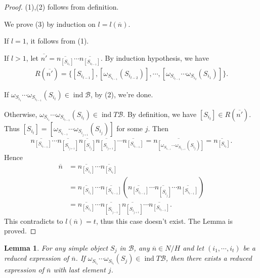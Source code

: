 \documentclass[12pt]{amsart}
\newtheorem{lemma}[theorem]{Lemma}
\begin{document}
\begin{proof}
    (1),(2) follows from definition.

    We prove (3) by induction on $l=l(\overline{n})$.

    If $l=1$, it follows from (1).

    If $l>1$, let $\overline{n'} = \overline{n_{[S_{i_1}]}} \cdots \overline{n_{[S_{i_{t-1}}]}}$. 
    By induction hypothesis, we have 
    \begin{align*}
        R(\overline{n'}) = \{ [S_{i_{t-1}}], [\omega_{S_{i_{t-1}}}(S_{i_{t-2}})], \cdots,[\omega_{S_{i_{t-1}}} \cdots \omega_{S_{i_2}}(S_{i_1})]   \}.
    \end{align*}
    
    If $\omega_{S_{i_1}} \cdots \omega_{S_{i_{t-1}}}(S_{i_t}) \in \operatorname{ind}\mathcal{B}$, by (2), we're done.
    
    Otherwise, $\omega_{S_{i_1}} \cdots \omega_{S_{i_{t-1}}}(S_{i_t}) \in \operatorname{ind}T\mathcal{B} $.
    By definition, we have $[S_{i_t}]\in R(\overline{n'})$.
    Thus $[S_{i_t}] = [\omega_{S_{i_{t-1}}} \cdots \omega_{S_{i_{j+1}}}(S_{i_j})] $ for some $j$.
    Then 
    \begin{align*}
         \overline{n_{[S_{i_{t-1}}]}} \cdots \overline{n_{[S_{i_{j+1}}]}} \overline{n_{[S_{i_{j}}]}} \overline{n_{[S_{i_{j+1}}]}} \cdots \overline{n_{[S_{i_{t-1}}]}} = \overline{n_{[ \omega_{S_{i_{t-1}}} \cdots \omega_{S_{i_{j+1}}}(S_{i_j}) ]}} = \overline{n_{[S_{i_t}]}}.
    \end{align*}
    Hence 
    \begin{align*}
        \overline{n}& = \overline{n_{[S_{i_1}]}} \cdots \overline{n_{[S_{i_t}]}} \\
             &= \overline{n_{[S_{i_1}]}} \cdots \overline{n_{[S_{i_{t-1}}]}} (  \overline{n_{[S_{i_{t-1}}]}} \cdots \overline{n_{[S_{i_{j}}]}} \cdots \overline{n_{[S_{i_{t-1}}]}})\\
             &=  \overline{n_{[S_{i_1}]}} \cdots \overline{n_{[S_{i_{j-1}}]}} \overline{n_{[S_{i_{j+1}}]}}  \cdots \overline{n_{[S_{i_{t-1}}]}}.
    \end{align*}
    This contradicts to $l(\overline{n}) = t$, thus this case doesn't exist.
    The Lemma is proved.
\end{proof}

\begin{lemma}\label{lastj}\cite[Lemma 8.3.2(iv)]{Springer}
    For any simple object $S_j$ in $\mathcal{B}$, any $\overline{n} \in N/H$ and let $(i_1,\cdots,i_t)$ be a reduced expression of $\overline{n}$.
    If $\omega_{S_{i_1}} \cdots \omega_{S_{i_{t}}}(S_j) \in \operatorname{ind}T\mathcal{B} $, then there exists a reduced expression of  $\overline{n}$ with last element $j$.
\end{lemma}
\end{document}
